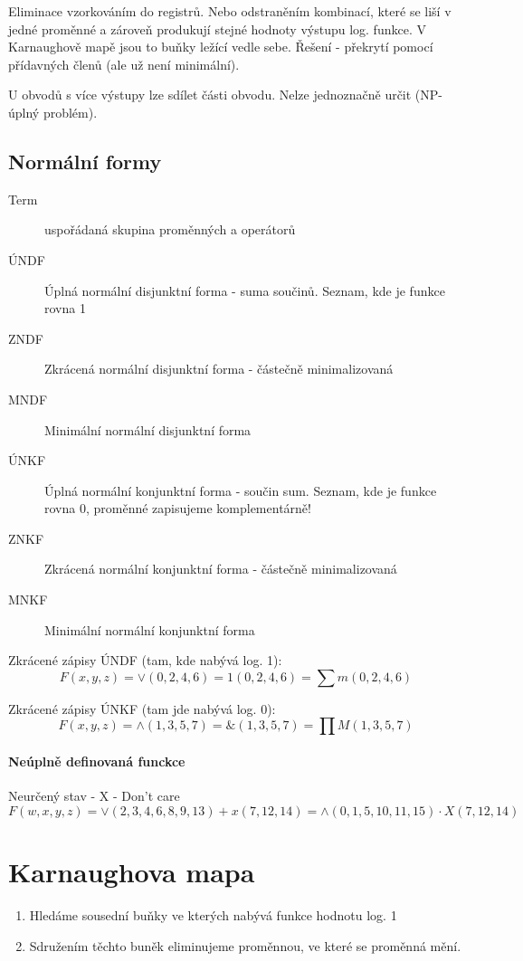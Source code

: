 \documentclass[a4paper, 11pt]{report}
\begin{document}
Eliminace vzorkováním do registrů. Nebo odstraněním kombinací, které se liší v jedné proměnné a zároveň produkují stejné hodnoty výstupu log. funkce. V Karnaughově mapě jsou to buňky ležící vedle sebe. Řešení - překrytí pomocí přídavných členů (ale už není minimální).

U obvodů s více výstupy lze sdílet části obvodu. Nelze jednoznačně určit (NP-úplný problém).

\subsection{Normální formy}

\begin{description}
	\item[Term] uspořádaná skupina proměnných a operátorů
	\item[ÚNDF] Úplná normální disjunktní forma - suma součinů. Seznam, kde je funkce rovna 1
	\item[ZNDF] Zkrácená normální disjunktní forma - částečně minimalizovaná
	\item[MNDF] Minimální normální disjunktní forma
	\item[ÚNKF] Úplná normální konjunktní forma - součin sum. Seznam, kde je funkce rovna 0, proměnné zapisujeme komplementárně!
	\item[ZNKF] Zkrácená normální konjunktní forma - částečně minimalizovaná
	\item[MNKF] Minimální normální konjunktní forma
\end{description}

Zkrácené zápisy ÚNDF (tam, kde nabývá log. 1):
$$ F(x,y,z) = \lor(0,2,4,6) = 1(0,2,4,6) = \sum{}m(0,2,4,6)$$

Zkrácené zápisy ÚNKF (tam jde nabývá log. 0):
$$ F(x,y,z) = \land(1,3,5,7) = \&(1,3,5,7) = \prod{}M(1,3,5,7)$$

\paragraph{Neúplně definovaná funckce}
Neurčený stav - X - Don't care
$$ F(w,x,y,z) = \lor(2,3,4,6,8,9,13) + x(7,12,14) = \land(0,1,5,10,11,15) \cdot X(7,12,14)$$


\section{Karnaughova mapa}

\begin{enumerate}
	\item Hledáme sousední buňky ve kterých nabývá funkce hodnotu log. 1
	\item Sdružením těchto buněk eliminujeme proměnnou, ve které se proměnná mění.
\end{enumerate}
\end{document}
